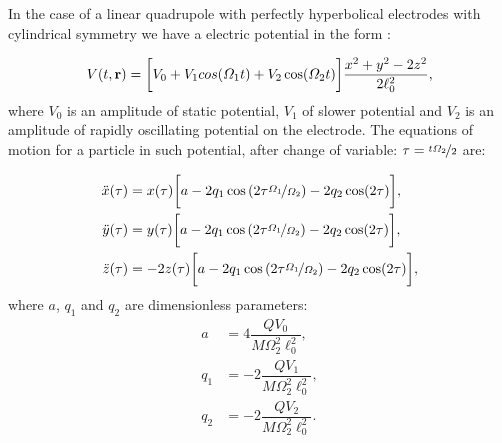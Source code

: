 

In the case of a linear quadrupole with perfectly hyperbolical electrodes with cylindrical symmetry we have a electric potential in the form \cite{leefer2017investigation}
:

\begin{equation}
	V(t, \vb{r}) = \bigg[ V_0 + V_1 cos(\Omega_1 t) + V_2 \cos(\Omega_2 t) \bigg] \frac{x^2 + y^2 - 2 z^2 }{2 \ell_0^2},
\end{equation}
where $V_0$ is an amplitude of static potential, $V_1$ of slower potential and $V_2$ is an amplitude of rapidly oscillating potential on the electrode. The equations of motion for a particle in such potential, after change of variable: $\tau = \nicefrac{t\Omega_2}{2}$ are:

\begin{subequations}
\label{eq of motion for simulation}
\begin{align}
	\ddot{x}(\tau) & = x(\tau) \bigg[ a - 2 q_1 \cos\left(2 \tau \nicefrac{\Omega_1}{\Omega_2} \right) - 2 q_2 \cos(2\tau) \bigg], \\
	\ddot{y}(\tau) & = y(\tau) \bigg[ a - 2 q_1 \cos\left(2 \tau \nicefrac{\Omega_1}{\Omega_2} \right) - 2 q_2 \cos(2\tau) \bigg], \\
	\label{studied eq of motion}
	\ddot{z}(\tau) & = -2z(\tau) \bigg[ a - 2 q_1 \cos\left(2 \tau \nicefrac{\Omega_1}{\Omega_2} \right) - 2 q_2 \cos(2\tau) \bigg],
\end{align}
\end{subequations}
where $a$, $q_1$ and $q_2$ are dimensionless parameters:
\begin{subequations}
\begin{align}
	\label{a}
	a & = 4 \dfrac{Q V_0}{M\Omega_2^2 \ell_0^2}, \\
	\label{q_1}
	q_1 & = -2 \dfrac{Q V_1}{M\Omega_2^2 \ell_0^2}, \\
	\label{q_2}
	q_2 & = -2 \dfrac{Q V_2}{M\Omega_2^2 \ell_0^2}.
\end{align}
\end{subequations}

